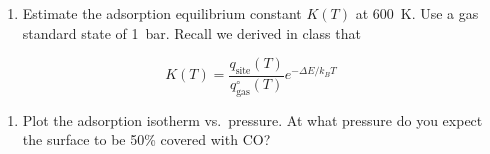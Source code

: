 \documentclass[11pt]{article}
\begin{document}
\begin{enumerate}
\item Estimate the adsorption equilibrium constant \(K(T)\) at \SI{600}{K}.  Use a gas standard
state of \SI{1}{bar}. Recall we derived in class that
\end{enumerate}
\[
 K(T) = \frac{q_\text{site}(T)}{q^{\circ}_\text{gas}(T)} e^{-\Delta{E}/k_{B}T}
\]

\begin{enumerate}
\item Plot the adsorption isotherm vs.~pressure.  At what pressure do you expect the surface to be 50\% covered with CO?
\end{enumerate}
\end{document}
